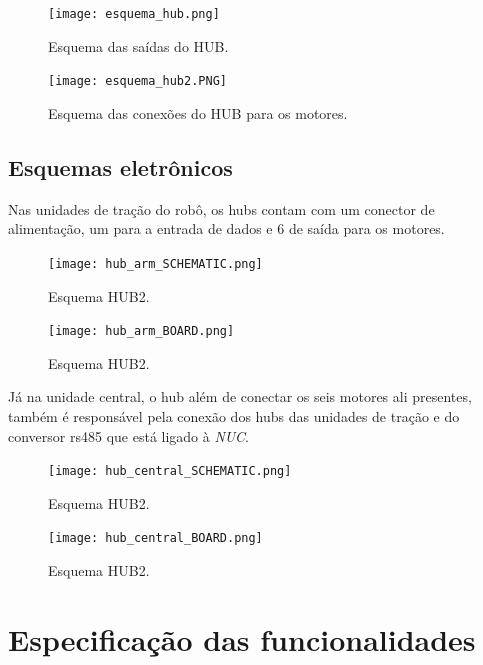 \begin{figure}[h!]												
	\centering												
	\texttt{[image: esquema\_hub.png]}				
	\caption{Esquema das saídas do HUB.}		
	\label{img:hub1}									
\end{figure}

\begin{figure}[h!]												
	\centering												
	\texttt{[image: esquema\_hub2.PNG]}				
	\caption{Esquema das conexões do HUB para os motores.}		
	\label{img:hub2}									
\end{figure}

\subsection{Esquemas eletrônicos}
\label{ssec:esqe}
Nas unidades de tração do robô, os hubs contam com um conector de alimentação, um para a entrada de dados e 6 de saída para os motores.

\begin{figure}[h!]												
	\centering												
	\texttt{[image: hub\_arm\_SCHEMATIC.png]}				
	\caption{Esquema HUB2.}		
	\label{img:hub2}									
\end{figure}

\begin{figure}[h!]												
	\centering												
	\texttt{[image: hub\_arm\_BOARD.png]}				
	\caption{Esquema HUB2.}		
	\label{img:hub2}									
\end{figure}

Já na unidade central, o hub além de conectar os seis motores ali presentes, também é responsável pela conexão dos hubs das unidades de tração e do conversor rs485 que está ligado à \textit{NUC}.
\begin{figure}[h!]												
	\centering												
	\texttt{[image: hub\_central\_SCHEMATIC.png]}				
	\caption{Esquema HUB2.}		
	\label{img:hub2}									
\end{figure}

\begin{figure}[h!]												
	\centering												
	\texttt{[image: hub\_central\_BOARD.png]}				
	\caption{Esquema HUB2.}		
	\label{img:hub2}									
\end{figure}

\section{Especificação das funcionalidades}
\label{sec:espf}


